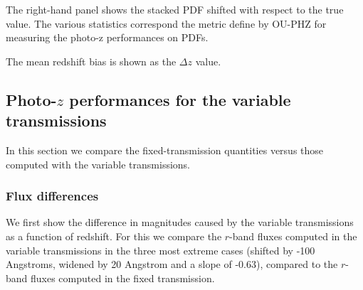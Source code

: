 \documentclass[11pt]{article}
\begin{document}
The right-hand panel shows the stacked PDF shifted with respect to the
true value. The various statistics correspond the metric define by
OU-PHZ for measuring the photo-z performances on PDFs.

The mean redshift bias is shown as the \(\Delta z\) value.

\subsection{\texorpdfstring{Photo-\(z\) performances for the variable
transmissions}{Photo-z performances for the variable transmissions}}\label{photo-z-performances-for-the-variable-transmissions}

In this section we compare the fixed-transmission quantities versus
those computed with the variable transmissions.

\subsubsection{Flux differences}\label{flux-differences}

We first show the difference in magnitudes caused by the variable
transmissions as a function of redshift. For this we compare the
\(r\)-band fluxes computed in the variable transmissions in the three
most extreme cases (shifted by -100 Angstroms, widened by 20 Angstrom
and a slope of -0.63), compared to the \(r\)-band fluxes computed in the
fixed transmission.
\end{document}
